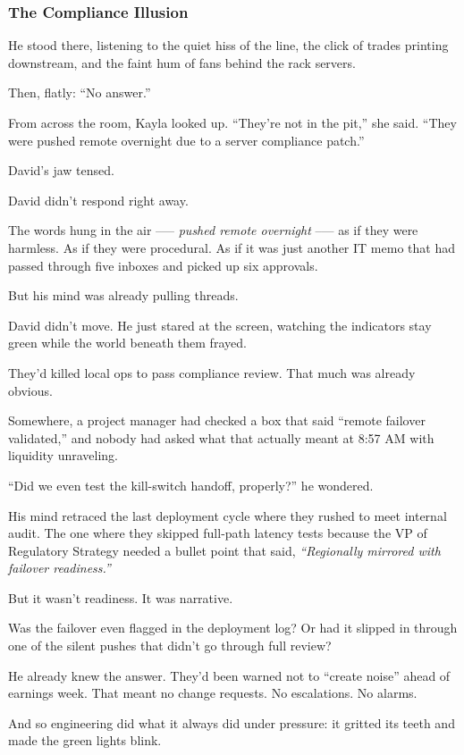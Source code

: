 \subsubsection{The Compliance Illusion}

He stood there, listening to the quiet hiss of the line, the click of trades printing downstream, and the faint hum of 
fans behind the rack servers.

Then, flatly: “No answer.”

From across the room, Kayla looked up.
“They’re not in the pit,” she said. “They were pushed remote overnight due to a server compliance patch.”

David’s jaw tensed.

David didn’t respond right away.

The words hung in the air --— \textit{pushed remote overnight} --— as if they were harmless. As if they were procedural. 
As if it was just another IT memo that had passed through five inboxes and picked up six approvals.

But his mind was already pulling threads.

David didn’t move. He just stared at the screen, watching the indicators stay green while the world 
beneath them frayed.

They’d killed local ops to pass compliance review. That much was already obvious.

Somewhere, a project manager had checked a box that said “remote failover validated,” and nobody had asked 
what that actually meant at 8:57 AM with liquidity unraveling.

``Did we even test the kill-switch handoff, properly?'' he wondered. 

His mind retraced the last deployment cycle where they rushed to meet internal audit. The one where they 
skipped full-path latency tests because the VP of Regulatory Strategy needed a bullet point that said, 
\textit{“Regionally mirrored with failover readiness.”}

But it wasn’t readiness. It was narrative.

Was the failover even flagged in the deployment log? Or had it slipped in through one of the silent pushes 
that didn’t go through full review?

He already knew the answer. They’d been warned not to “create noise” ahead of earnings week. That meant no 
change requests. No escalations. No alarms.

And so engineering did what it always did under pressure: it gritted its teeth and made the green lights 
blink.

